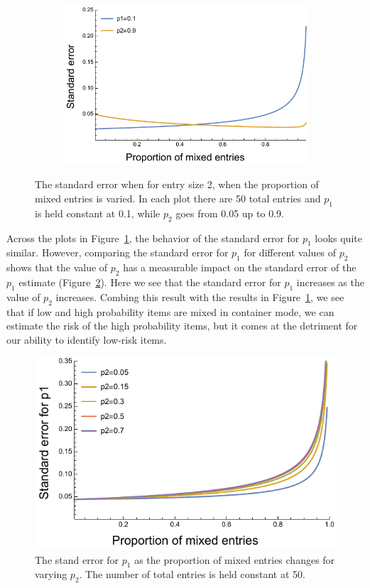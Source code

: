\documentclass{article}
\begin{document}
\begin{figure}[H]
\begin{subfigure}[b]{0.49\textwidth}
\end{subfigure}
\begin{subfigure}[b]{0.49\textwidth}
\includegraphics[width=\textwidth]{../asymptotic_approximation/SE_twotype_p1_01_p2_09.pdf}
\end{subfigure}

\caption{The standard error when for entry size 2, when the proportion of mixed entries is varied. In each plot there are 50 total entries and \(p_1\) is held constant at 0.1, while \(p_2\) goes from 0.05 up to 0.9.}
\label{fig:two_type_se_fourplot}
\end{figure}


Across the plots in Figure~\ref{fig:two_type_se_fourplot}, the behavior of the standard error for \(p_1\) looks quite similar. However, comparing the standard error for \(p_1\) for different values of \(p_2\) shows that the value of \(p_2\) has a measurable impact on the standard error of the \(p_1\) estimate (Figure~\ref{fig:two_type_p1_fixed_p2_vary}). Here we see that the standard error for \(p_1\) increases as the value of \(p_2\) increases. Combing this result with the results in Figure~\ref{fig:two_type_se_fourplot}, we see that if low and high probability items are mixed in container mode, we can estimate the risk of the high probability items, but it comes at the detriment for our ability to identify low-risk items. 



\begin{figure}[H]
\includegraphics[width=.65\textwidth]{../asymptotic_approximation/SE_twotype_p1_p2_range.pdf}
\caption{The stand error for \(p_1\) as the proportion of mixed entries changes for varying \(p_2\). The number of total entries is held constant at 50.}
\label{fig:two_type_p1_fixed_p2_vary}
\end{figure}
\end{document}
